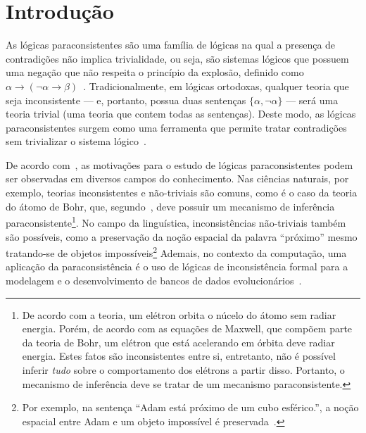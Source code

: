 \chapter{Introdução}\label{cap:Introducao}


As lógicas paraconsistentes são uma família de lógicas na qual a presença de contradições não implica trivialidade, ou seja, são sistemas lógicos que possuem uma negação que não respeita o princípio da explosão, definido como $\alpha \to (\neg \alpha \to \beta)$~\cite{carnielli2007}. Tradicionalmente, em lógicas ortodoxas, qualquer teoria que seja inconsistente {---} e, portanto, possua duas sentenças $\{\alpha, \neg \alpha\}$ {---} será uma teoria trivial (uma teoria que contem todas as sentenças). Deste modo, as lógicas paraconsistentes surgem como uma ferramenta que permite tratar contradições sem trivializar o sistema lógico~\cite{Carnielli_Coniglio_2016}.

De acordo com~, as motivações para o estudo de lógicas paraconsistentes podem ser observadas em diversos campos do conhecimento. Nas ciências naturais, por exemplo, teorias inconsistentes e não-triviais são comuns, como é o caso da teoria do átomo de Bohr, que, segundo~, deve possuir um mecanismo de inferência paraconsistente\footnote{De acordo com a teoria, um elétron orbita o núcelo do átomo sem radiar energia. Porém, de acordo com as equações de Maxwell, que compõem parte da teoria de Bohr, um elétron que está acelerando em órbita deve radiar energia. Estes fatos são inconsistentes entre si, entretanto, não é possível inferir \textit{tudo} sobre o comportamento dos elétrons a partir disso. Portanto, o mecanismo de inferência deve se tratar de um mecanismo paraconsistente.}. No campo da linguística, inconsistências não-triviais também são possíveis, como a preservação da noção espacial da palavra ``próximo'' mesmo tratando-se de objetos impossíveis\footnote{Por exemplo, na sentença ``Adam está próximo de um cubo esférico.'', a noção espacial entre Adam e um objeto impossível é preservada~\cite{McGinnis2013-MCGTUA}.} Ademais, no contexto da computação, uma aplicação da paraconsistência é o uso de lógicas de inconsistência formal para a modelagem e o desenvolvimento de bancos de dados evolucionários~\cite{carnielli2000formal}.

